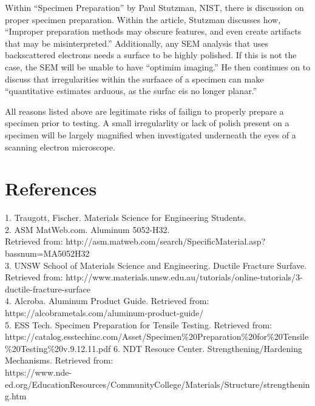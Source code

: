 \documentclass{article}
\begin{document}
Within ``Specimen Preparation'' by Paul Stutzman, NIST, there is discussion on proper specimen preparation. Within the article, Stutzman discusses how, ``Improper preparation methods may obscure features, and even create artifacts that may be misinterpreted.'' Additionally, any SEM analysis that uses backscattered electrons needs a surface to be highly polished. If this is not the case, the SEM will be unable to have ``optimim imaging.'' He then continues on to discuss that irregularities within the surfaace of a specimen can make ``quantitative estimates arduous, as the surfac eis no longer planar.''

All reasons listed above are legitimate risks of failign to properly prepare a specimen prior to testing. A small irregularlity or lack of polish present on a specimen will be largely magnified when investigated underneath the eyes of a scanning electron microscope.

\newpage
\section{References}
1. Traugott, Fischer. Materials Science for Engineering Students. \\
2. ASM MatWeb.com. Aluminum 5052-H32. \\ Retrieved from: http://asm.matweb.com/search/SpecificMaterial.asp?bassnum=MA5052H32 \\
3. UNSW School of Materials Science and Engineering. Ductile Fracture Surfave. Retrieved from: http://www.materials.unsw.edu.au/tutorials/online-tutorials/3-ductile-fracture-surface \\
4. Alcroba. Aluminum Product Guide. Retrieved from: https://alcobrametals.com/aluminum-product-guide/ \\
5. ESS Tech. Specimen Preparation for Tensile Testing. Retrieved from: https://catalog.esstechinc.com/Asset/Specimen\%20Preparation\%20for\%20Tensile\%20Testing\%20v.9.12.11.pdf
6. NDT Resouce Center. Strengthening/Hardening Mechanisms. Retrieved from:\\ https://www.nde-ed.org/EducationResources/CommunityCollege/Materials/Structure/strengthening.htm
\end{document}
